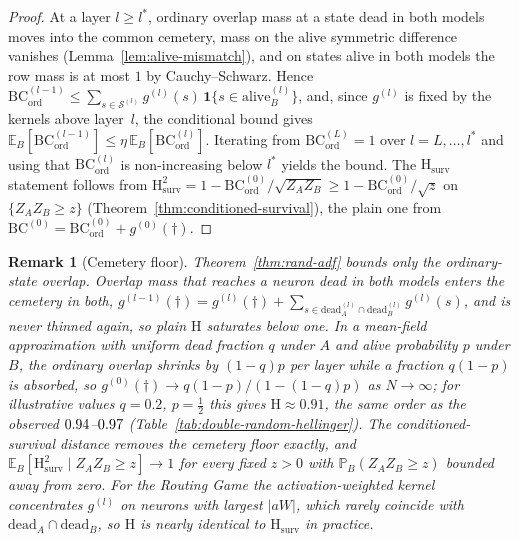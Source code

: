 \documentclass[twoside]{article}
\newcommand{\1}{\mathbf{1}}
\newtheorem{remark}{Remark}
\begin{document}
\begin{proof}
At a layer $l \geq l^*$, ordinary overlap mass at a state dead in both models moves into the common
cemetery, mass on the alive symmetric difference vanishes (Lemma~\ref{lem:alive-mismatch}), and on
states alive in both models the row mass is at most $1$ by Cauchy--Schwarz.  Hence
$\mathrm{BC}^{(l-1)}_{\mathrm{ord}} \leq \sum_{s \in \mathcal{S}^{(l)}} g^{(l)}(s)\,\1\{s \in
    \mathrm{alive}^{(l)}_B\}$, and, since $g^{(l)}$ is fixed by the kernels above layer~$l$, the
conditional bound gives $\mathbb{E}_B[\mathrm{BC}^{(l-1)}_{\mathrm{ord}}] \leq
    \eta\,\mathbb{E}_B[\mathrm{BC}^{(l)}_{\mathrm{ord}}]$.  Iterating from
$\mathrm{BC}^{(L)}_{\mathrm{ord}} = 1$ over $l = L, \ldots, l^*$ and using that
$\mathrm{BC}^{(l)}_{\mathrm{ord}}$ is non-increasing below $l^*$ yields the bound.  The
$\mathrm{H}_{\mathrm{surv}}$ statement follows from $\mathrm{H}^2_{\mathrm{surv}} = 1 -
    \mathrm{BC}^{(0)}_{\mathrm{ord}}/\sqrt{Z_A Z_B} \geq 1 - \mathrm{BC}^{(0)}_{\mathrm{ord}}/\sqrt{z}$
on $\{Z_A Z_B \geq z\}$ (Theorem~\ref{thm:conditioned-survival}), the plain one from
$\mathrm{BC}^{(0)} = \mathrm{BC}^{(0)}_{\mathrm{ord}} + g^{(0)}(\dagger)$.
\end{proof}

\begin{remark}[Cemetery floor]\label{rem:adf-cemetery-floor}
Theorem~\ref{thm:rand-adf} bounds only the ordinary-state overlap.  Overlap mass that reaches a
neuron dead in both models enters the cemetery in both, $g^{(l-1)}(\dagger) = g^{(l)}(\dagger) +
    \sum_{s \in \mathrm{dead}^{(l)}_A \cap \mathrm{dead}^{(l)}_B} g^{(l)}(s)$, and is never thinned
again, so plain $\mathrm{H}$ saturates below one.  In a mean-field approximation with uniform dead
fraction $q$ under $A$ and alive probability $p$ under $B$, the ordinary overlap shrinks by
$(1-q)p$ per layer while a fraction $q(1-p)$ is absorbed, so $g^{(0)}(\dagger) \to
    q(1-p)/(1-(1-q)p)$ as $N \to \infty$; for illustrative values $q = 0.2$, $p = \tfrac{1}{2}$ this
gives $\mathrm{H} \approx 0.91$, the same order as the observed $0.94$--$0.97$
(Table~\ref{tab:double-random-hellinger}).  The conditioned-survival distance removes the cemetery
floor exactly, and $\mathbb{E}_B[\mathrm{H}^2_{\mathrm{surv}} \mid Z_A Z_B \geq z] \to 1$ for every
fixed $z > 0$ with $\mathbb{P}_B(Z_A Z_B \geq z)$ bounded away from zero.  For the Routing Game the
activation-weighted kernel concentrates $g^{(l)}$ on neurons with largest $|a W|$, which rarely
coincide with $\mathrm{dead}_A \cap \mathrm{dead}_B$, so $\mathrm{H}$ is nearly identical to
$\mathrm{H}_{\mathrm{surv}}$ in practice.
\end{remark}
\end{document}
